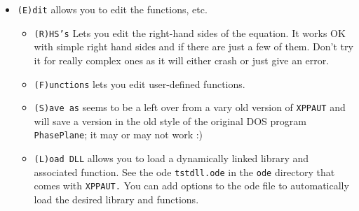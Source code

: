 \documentclass{article}
\begin{document}
\begin{itemize}
\item {\tt (E)dit} allows you to edit the functions, etc.
\begin{itemize}
\item {\tt (R)HS's} Lets you edit the right-hand sides of the equation. It works OK with simple right hand sides and if there are just a few of them. Don't try it for really complex ones as it will either crash or just give an error.
\item {\tt (F)unctions} lets you edit user-defined functions.
\item {\tt (S)ave as} seems to be a left over from a vary old version of {\tt XPPAUT} and will save a version in the old style of the original DOS program {\tt PhasePlane}; it may or may not work :)
\item {\tt (L)oad DLL} allows you to load a dynamically linked library and associated function. See the ode {\tt tstdll.ode} in the {\tt ode} directory that comes with {\tt XPPAUT.}  You can add options to the ode file to automatically load the desired library and functions.    
\end{itemize}


\end{itemize}
\end{document}

